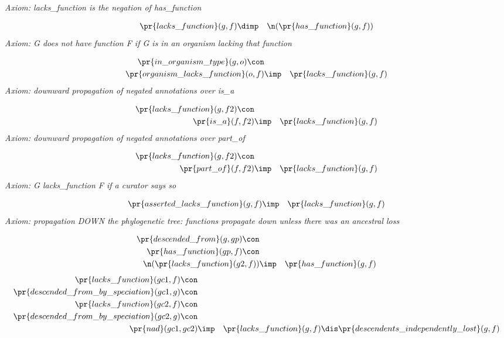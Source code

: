 \emph{Axiom: lacks\_function is the negation of has\_function}

\begin{eqnarray*}
 \pr{lacks\_function}(g, f) &\dimp & \n( \pr{has\_function}(g, f) )
\end{eqnarray*}
\emph{Axiom: G does not have function F if G is in an organism lacking that function}

\begin{eqnarray*}
 \pr{in\_organism\_type}(g, o) \con \\
 \pr{organism\_lacks\_function}(o, f) &\imp & \pr{lacks\_function}(g, f) 
\end{eqnarray*}
\emph{Axiom: downward propagation of negated annotations over is\_a}

\begin{eqnarray*}
 \pr{lacks\_function}(g, f2) \con \\
 \pr{is\_a}(f, f2) &\imp & \pr{lacks\_function}(g, f) 
\end{eqnarray*}
\emph{Axiom: downward propagation of negated annotations over part\_of}

\begin{eqnarray*}
 \pr{lacks\_function}(g, f2) \con \\
 \pr{part\_of}(f, f2) &\imp & \pr{lacks\_function}(g, f) 
\end{eqnarray*}
\emph{Axiom: G lacks\_function F if a curator says so}

\begin{eqnarray*}
 \pr{asserted\_lacks\_function}(g, f) &\imp & \pr{lacks\_function}(g, f) 
\end{eqnarray*}
\emph{Axiom: propagation DOWN the phylogenetic tree: functions propagate down unless there was an ancestral loss}

\begin{eqnarray*}
 \pr{descended\_from}(g, gp) \con \\
 \pr{has\_function}(gp, f) \con \\
 \n( \pr{lacks\_function}(g2, f) )&\imp & \pr{has\_function}(g, f) 
\end{eqnarray*}
\begin{eqnarray*}
 \pr{lacks\_function}(gc1, f) \con \\
 \pr{descended\_from\_by\_speciation}(gc1, g) \con \\
 \pr{lacks\_function}(gc2, f) \con \\
 \pr{descended\_from\_by\_speciation}(gc2, g) \con \\
 \pr{nad}(gc1, gc2) &\imp & \pr{lacks\_function}(g, f) \dis  \pr{descendents\_independently\_lost}(g, f) 
\end{eqnarray*}
